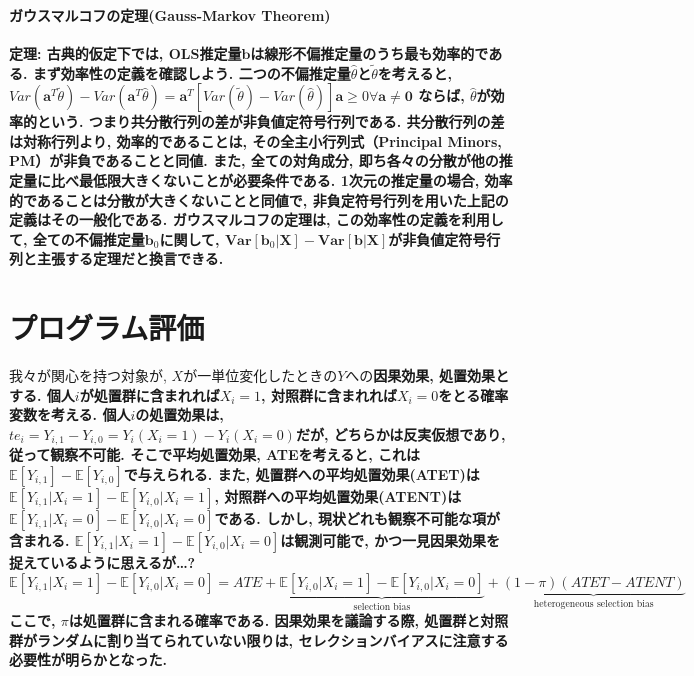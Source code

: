 \documentclass[paper=a4paper,fontsize=10pt]{jlreq}
\begin{document}
\paragraph{ガウスマルコフの定理(Gauss-Markov Theorem)}
\rmfamily\mcfamily\bfseries{定理}\mdseries : 古典的仮定下では, OLS推定量$\mathbf{b}$は線形不偏推定量のうち最も効率的である. まず効率性の定義を確認しよう. 二つの不偏推定量$\hat{\theta}$と$\tilde{\theta}$を考えると, $Var(\mathbf{a}^T\tilde{\theta})-Var(\mathbf{a}^T\hat{\theta})=\mathbf{a}^T[Var(\tilde{\theta})-Var(\hat{\theta})]\mathbf{a} \geq  0　\forall\mathbf{a}\neq \mathbf{0}$ ならば, $\hat{\theta}$が効率的という. つまり共分散行列の差が非負値定符号行列である. 共分散行列の差は対称行列より, 効率的であることは, その全主小行列式（Principal Minors, PM）が非負であることと同値. また, 全ての対角成分, 即ち各々の分散が他の推定量に比べ最低限大きくないことが必要条件である. 1次元の推定量の場合, 効率的であることは分散が大きくないことと同値で, 非負定符号行列を用いた上記の定義はその一般化である. ガウスマルコフの定理は, この効率性の定義を利用して, 全ての不偏推定量$\mathbf{b}_0$に関して, $\mathbf{Var}[\mathbf{b}_0|\mathbf{X}] - \mathbf{Var}[\mathbf{b}|\mathbf{X}]$が非負値定符号行列と主張する定理だと換言できる.\\

\section{プログラム評価}
我々が関心を持つ対象が, $X$が一単位変化したときの$Y$への\rmfamily\mcfamily\bfseries{因果効果, 処置効果}\mdseries とする. 個人$i$が処置群に含まれれば$X_i=1$, 対照群に含まれれば$X_i=0$をとる確率変数を考える. 個人$i$の処置効果は, $te_i=Y_{i,1}-Y_{i,0}=Y_{i}(X_i=1)-Y_{i}(X_i=0)$だが, どちらかは反実仮想であり, 従って観察不可能. そこで\rmfamily\mcfamily\bfseries{平均処置効果, ATE}\mdseries を考えると, これは$\mathbb{E}[Y_{i,1}]-\mathbb{E}[Y_{i,0}]$で与えられる. また, 処置群への平均処置効果(ATET)は$\mathbb{E}[Y_{i,1}|X_i=1]-\mathbb{E}[Y_{i,0}|X_i=1]$, 対照群への平均処置効果(ATENT)は$\mathbb{E}[Y_{i,1}|X_i=0]-\mathbb{E}[Y_{i,0}|X_i=0]$である. しかし, 現状どれも観察不可能な項が含まれる. $\mathbb{E}[Y_{i,1}|X_i=1]-\mathbb{E}[Y_{i,0}|X_i=0]$は観測可能で, かつ一見因果効果を捉えているように思えるが\dots?
\begin{equation*}
  \mathbb{E}[Y_{i,1}|X_i=1]-\mathbb{E}[Y_{i,0}|X_i=0]=ATE+\underset{\text{selection bias}}{\underbrace{\mathbb{E}[Y_{i,0}|X_i=1]-\mathbb{E}[Y_{i,0}|X_i=0]}}+\underset{\text{heterogeneous selection bias}}{\underbrace{(1-\pi)(ATET-ATENT)}}
\end{equation*}
ここで, $\pi$は処置群に含まれる確率である. 因果効果を議論する際, 処置群と対照群がランダムに割り当てられていない限りは, セレクションバイアスに注意する必要性が明らかとなった.\\
\end{document}
